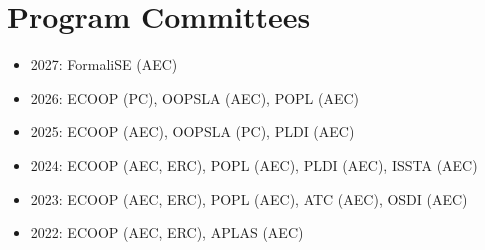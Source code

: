 \section{Program Committees}
\begin{itemize}[nosep,after=\strut, leftmargin=1em, itemsep=3pt]
    \item[--] 2027: FormaliSE (AEC)
    \item[--] 2026: ECOOP (PC), OOPSLA (AEC), POPL (AEC)
    \item[--] 2025: ECOOP (AEC), OOPSLA (PC), PLDI (AEC)
    \item[--] 2024: ECOOP (AEC, ERC), POPL (AEC), PLDI (AEC), ISSTA (AEC)
    \item[--] 2023: ECOOP (AEC, ERC), POPL (AEC), ATC (AEC), OSDI (AEC)
    \item[--] 2022: ECOOP (AEC, ERC), APLAS (AEC)
\end{itemize}
